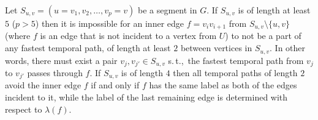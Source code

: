 \documentclass[a4paper,UKenglish,cleveref, autoref, thm-restate]{lipics-v2021}
\renewcommand{\st}{s.\,t.,\ }
\begin{document}
\begin{lemma}\label{lemma:FPT-noUndeterminedEdgeInSegment}
Let $S_{u,v}= (u=v_1,v_2, \dots, v_p = v)$ be a segment in $G$.
If $S_{u,v}$ is of length at least $5$ ($p > 5$) 
then it is impossible for an inner edge $f = v_i v_{i+1}$ from $S_{u,v} \setminus \{u,v\}$ (where $f$ is an edge that is not incident to a vertex from $U$)
to not be a part of any fastest temporal path, of length at least $2$ between vertices in $S_{u,v}$.
In other words, there must exist a pair $v_j, v_{j'} \in S_{u,v}$ \st the fastest temporal path from $v_j$ to $v_{j'}$ passes through $f$.
If $S_{u,v}$ is of length $4$ then all temporal paths of length $2$ avoid the inner edge $f$ if and only if $f$ has the same label as both of the edges incident to it, while the label of the last remaining edge is determined with respect to $\lambda(f)$.
\end{lemma}
\end{document}

